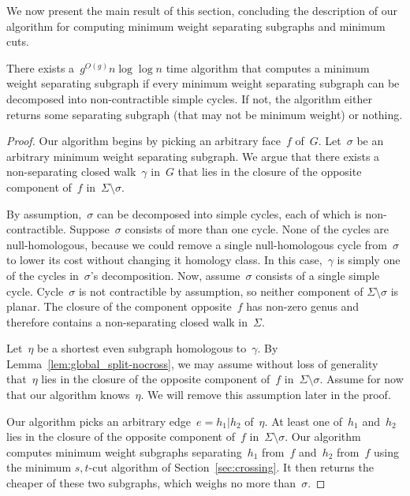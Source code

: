 We now present the main result of this section, concluding the description of our algorithm for computing minimum weight separating subgraphs and minimum cuts.
\begin{lemma}
  \label{lem:global_split-alg}
  There exists a~$g^{O(g)} n \log \log n$ time algorithm that computes a minimum weight separating subgraph if every minimum weight separating subgraph can be decomposed into non-contractible simple cycles. If not, the algorithm either returns some separating subgraph (that may not be minimum weight) or nothing.
\end{lemma}
\begin{proof}
Our algorithm begins by picking an arbitrary face~$f$ of~$G$. Let~$\sigma$ be an arbitrary minimum weight separating subgraph.
We argue that there exists a non-separating closed walk~$\gamma$ in~$G$ that lies in the closure of the opposite component of~$f$ in~$\Sigma \setminus \sigma$.

By assumption,~$\sigma$ can be decomposed into simple cycles, each of which is non-contractible. Suppose~$\sigma$ consists of more than one cycle. None of the cycles are null-homologous, because we could remove a single null-homologous cycle from~$\sigma$ to lower its cost without changing it homology class.
In this case,~$\gamma$ is simply one of the cycles in~$\sigma$'s decomposition. Now, assume~$\sigma$ consists of a single simple cycle. Cycle~$\sigma$ is not contractible by assumption, so neither component of $\Sigma \setminus \sigma$ is planar. The closure of the component opposite~$f$ has non-zero genus and therefore contains a non-separating closed walk in~$\Sigma$.

Let~$\eta$ be a shortest even subgraph homologous to~$\gamma$.
By Lemma~\ref{lem:global_split-nocross}, we may assume without loss of generality that~$\eta$ lies in the closure of the opposite component of~$f$ in~$\Sigma \setminus \sigma$. Assume for now that our algorithm knows~$\eta$. We will remove this assumption later in the proof.

Our algorithm picks an arbitrary edge~$e = h_1 | h_2$ of~$\eta$. At least one of~$h_1$ and~$h_2$ lies in the closure of the opposite component of~$f$ in~$\Sigma \setminus \sigma$. Our algorithm computes minimum weight subgraphs separating~$h_1$ from~$f$ and~$h_2$ from~$f$ using the minimum $s,t$-cut algorithm of Section~\ref{sec:crossing}. It then returns the cheaper of these two subgraphs, which weighs no more than~$\sigma$.


\end{proof}
